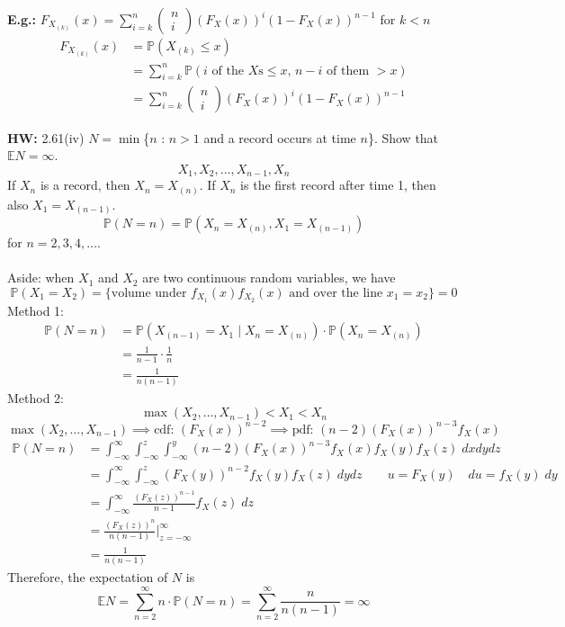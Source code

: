 \documentclass[a4paper]{article}
\newcommand{\n}{\hfill\break}
\newcommand{\eg}[1]{\par\noindent\settowidth{\hangindent}{\textbf{E.g.: }}\textbf{E.g.: }#1\n}
\newcommand{\hw}[1]{\par\noindent\settowidth{\hangindent}{\textbf{HW: }}\textbf{HW: }#1\n}
\newcommand{\Prob}{\mathbb{P}}
\renewcommand{\P}{\Prob}
\newcommand{\Avg}{\mathbb{E}}
\newcommand{\E}{\Avg}
\begin{document}
\eg{
    $F_{X_{(k)}}(x)=\sum^n_{i=k}\begin{pmatrix}n\\i\end{pmatrix}(F_X(x))^i(1-F_X(x))^{n-1}$ for $k<n$
    \begin{align*}
        F_{X_{(k)}}(x)&=\P(X_{(k)}\leq x) \\
        &=\sum^n_{i=k}\P(\text{$i$ of the $X$s$\leq x$, $n-i$ of them $>x$}) \\
        &=\sum^n_{i=k}\begin{pmatrix}n\\i\end{pmatrix}(F_X(x))^i(1-F_X(x))^{n-1}
    \end{align*}
}

\hw{
    2.61(iv) $N=\min$\{$n$ : $n>1$ and a record occurs at time $n$\}. Show that $\E N=\infty$.
    \[X_1, X_2, \dots, X_{n-1}, X_n\]
    If $X_n$ is a record, then $X_n=X_{(n)}$. If $X_n$ is the first record after time 1, then also $X_1=X_{(n-1)}$.
    \[\P(N=n)=\P(X_n=X_{(n)}, X_1=X_{(n-1)})\]
    for $n=2, 3, 4, \dots$.
    \\\\
    Aside: when $X_1$ and $X_2$ are two continuous random variables, we have
    \[\P(X_1=X_2)=\{\text{volume under $f_{X_1}(x)f_{X_2}(x)$ and over the line $x_1=x_2$}\}=0\]
    Method 1:
        \begin{align*}
            \P(N=n)&=\P(X_{(n-1)}=X_1\mid X_n=X_{(n)})\cdot\P(X_n=X_{(n)}) \\
            &=\frac{1}{n-1}\cdot\frac{1}{n} \\
            &=\frac{1}{n(n-1)}
        \end{align*}
    Method 2:
        \[\max(X_2, \dots, X_{n-1})<X_1<X_n\]
        \[\max(X_2, \dots, X_{n-1}) \implies \text{cdf: } (F_X(x))^{n-2} \implies \text{pdf: } (n-2)(F_X(x))^{n-3}f_X(x)\]
        \begin{align*}
            \P(N=n)&=\int^\infty_{-\infty}\int^z_{-\infty}\int^y_{-\infty}(n-2)(F_X(x))^{n-3}f_X(x)f_X(y)f_X(z)\;dxdydz \\
            &=\int^\infty_{-\infty}\int^z_{-\infty}(F_X(y))^{n-2}f_X(y)f_X(z)\;dydz  \qquad u=F_X(y)\quad du=f_X(y)\;dy\\
            &=\int^\infty_{-\infty}\frac{(F_X(z))^{n-1}}{n-1}f_X(z)\;dz \\
            &=\frac{(F_X(z))^{n}}{n(n-1)}\bigg\vert^\infty_{z=-\infty} \\
            &=\frac{1}{n(n-1)}
        \end{align*}
    Therefore, the expectation of $N$ is
    \[\E N=\sum^\infty_{n=2}n\cdot\P(N=n)=\sum^\infty_{n=2}\frac{n}{n(n-1)}=\infty\]
}
\end{document}
